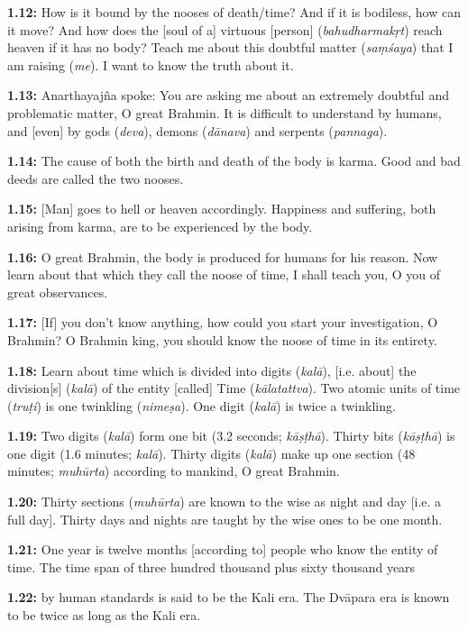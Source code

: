 \documentclass{article}
\newcommand{\vsnum}[1]{\textbf{#1}}
\newcommand{\skt}[1]{\textit{#1}}
\begin{document}
\vsnum{1.12: }How is it bound by the nooses of death/time? And if it is bodiless, how can it move? And how does the [soul of a] virtuous [person] (\skt{bahudharmakṛt}) reach heaven if it has no body? Teach me about this doubtful matter (\skt{saṃśaya}) that I am raising (\skt{me}). I want to know the truth about it.

\vsnum{1.13: }Anarthayajña spoke: You are asking me about an extremely doubtful and problematic matter, O great Brahmin. It is difficult to understand by humans, and [even] by gods (\skt{deva}), demons (\skt{dānava}) and serpents (\skt{pannaga}).

\vsnum{1.14: }The cause of both the birth and death of the body is karma. Good and bad deeds are called the two nooses.

\vsnum{1.15: }[Man] goes to hell or heaven accordingly. Happiness and suffering, both arising from karma, are to be experienced by the body.

\vsnum{1.16: }O great Brahmin, the body is produced for humans for his reason. Now learn about that which they call the noose of time, I shall teach you, O you of great observances.

\vsnum{1.17: }[If] you don't know anything, how could you start your investigation, O Brahmin? O Brahmin king, you should know the noose of time in its entirety.

\vsnum{1.18: }Learn about time which is divided into digits (\skt{kalā}), [i.e. about] the division[s] (\skt{kalā}) of the entity [called] Time (\skt{kālatattva}). Two atomic units of time (\skt{truṭi}) is one twinkling (\skt{nimeṣa}). One digit (\skt{kalā}) is twice a twinkling.

\vsnum{1.19: }Two digits (\skt{kalā}) form one bit (3.2 seconds; \skt{kāṣṭhā}). Thirty bits (\skt{kāṣṭhā}) is one digit (1.6 minutes; \skt{kalā}). Thirty digits (\skt{kalā}) make up one section (48 minutes; \skt{muhūrta}) according to mankind, O great Brahmin.

\vsnum{1.20: }Thirty sections (\skt{muhūrta}) are known to the wise as night and day [i.e. a full day]. Thirty days and nights are taught by the wise ones to be one month.

\vsnum{1.21: }One year is twelve months [according to] people who know the entity of time. The time span of three hundred thousand plus sixty thousand years

\vsnum{1.22: }by human standards is said to be the Kali era. The Dvāpara era is known to be twice as long as the Kali era.
\end{document}
